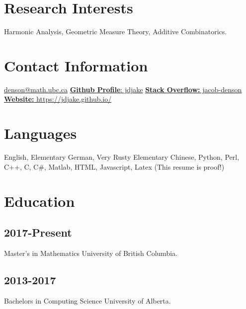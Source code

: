 \documentclass{friggeri-cv}
\newenvironment{changemargin}[2]{%
\begin{list}{}{%
\setlength{\topsep}{0pt}%
\setlength{\leftmargin}{#1}%
\setlength{\rightmargin}{#2}%
\setlength{\listparindent}{\parindent}%
\setlength{\itemindent}{\parindent}%
\setlength{\parsep}{\parskip}%
}%
\item[]}{\end{list}}
\begin{document}


\begin{aside} %
\section{Research Interests}
Harmonic Analysis, Geometric Measure Theory, Additive Combinatorics.
\section{Contact Information}
\href{mailto:denson@math.ubc.ca}{denson@math.ubc.ca} 
\href{https://github.com/jdjake}{{\bf Github Profile}: jdjake} 
\href{http://stackoverflow.com/users/2601483/jacob-denson}{{\bf Stack Overflow:} jacob-denson} 
\href{https://jdjake.github.io/}{{\bf Website:} https://jdjake.github.io/}
\section{Languages}
English, Elementary German, Very Rusty Elementary Chinese, Python, Perl, C++, C, C\#, Matlab, HTML, Javascript, Latex
(This resume is proof!)
\section{Education}
\subsection{2017-Present}
Master's in Mathematics
University of British Columbia.
\subsection{2013-2017}
Bachelors in Computing Science
University of Alberta.
\end{aside}


\end{document}
